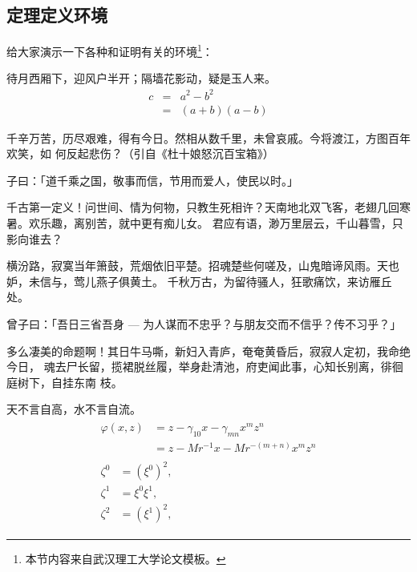 \subsection{定理定义环境}
\label{subsec-morethm}
给大家演示一下各种和证明有关的环境\footnote{本节内容来自武汉理工大学论文模板。}：

\begin{assumption}
待月西厢下，迎风户半开；隔墙花影动，疑是玉人来。
\begin{eqnarray}
  \label{eq:eqnxmp}
  c & = & a^2 - b^2\\
    & = & (a+b)(a-b)
\end{eqnarray}
\end{assumption}

千辛万苦，历尽艰难，得有今日。然相从数千里，未曾哀戚。今将渡江，方图百年欢笑，如
何反起悲伤？（引自《杜十娘怒沉百宝箱》）

\begin{definition}
子曰：「道千乘之国，敬事而信，节用而爱人，使民以时。」
\end{definition}

千古第一定义！问世间、情为何物，只教生死相许？天南地北双飞客，老翅几回寒暑。欢乐趣，离别苦，就中更有痴儿女。
君应有语，渺万里层云，千山暮雪，只影向谁去？

横汾路，寂寞当年箫鼓，荒烟依旧平楚。招魂楚些何嗟及，山鬼暗谛风雨。天也妒，未信与，莺儿燕子俱黄土。
千秋万古，为留待骚人，狂歌痛饮，来访雁丘处。

\begin{proposition}
 曾子曰：「吾日三省吾身 --- 为人谋而不忠乎？与朋友交而不信乎？传不习乎？」
\end{proposition}

多么凄美的命题啊！其日牛马嘶，新妇入青庐，奄奄黄昏后，寂寂人定初，我命绝今日，
魂去尸长留，揽裙脱丝履，举身赴清池，府吏闻此事，心知长别离，徘徊庭树下，自挂东南
枝。

\begin{remark}
天不言自高，水不言自流。
\begin{gather*}
\begin{split} 
\varphi(x,z)
&=z-\gamma_{10}x-\gamma_{mn}x^mz^n\\
&=z-Mr^{-1}x-Mr^{-(m+n)}x^mz^n
\end{split}\\[6pt]
\begin{align} \zeta^0&=(\xi^0)^2,\\
\zeta^1 &=\xi^0\xi^1,\\
\zeta^2 &=(\xi^1)^2,
\end{align}
\end{gather*}
\end{remark}

